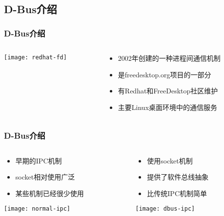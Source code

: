 \subsection{D-Bus介绍} %
\begin{frame}[fragile]
    \frametitle{D-Bus介绍}

	\begin{columns}
	\begin{column}{.4\textwidth}
		
	\texttt{[image: redhat-fd]}
		
	\end{column}
	\begin{column}{.6\textwidth}
		\large
    \begin{itemize}
        \item 2002年创建的一种进程间通信机制
        \item 是freedesktop.org项目的一部分
        \item 有Redhat和FreeDesktop社区维护
		\item 主要Linux桌面环境中的通信服务
    \end{itemize}
	\end{column}
	\end{columns}
\end{frame}
\begin{frame}[fragile]
	\frametitle{D-Bus介绍}
	
	\begin{columns}
		\begin{column}{.5\textwidth}
			\begin{itemize}
			\item 早期的IPC机制
			\item socket相对使用广泛
			\item 某些机制已经很少使用
			\end{itemize}			
			\texttt{[image: normal-ipc]}
			
		\end{column}
		\pause
		\begin{column}{.5\textwidth}
			\begin{itemize}
				\item 使用socket机制
				\item 提供了软件总线抽象
				\item 比传统IPC机制简单
			\end{itemize}
			\texttt{[image: dbus-ipc]}
		\end{column}
	\end{columns}
\end{frame}

